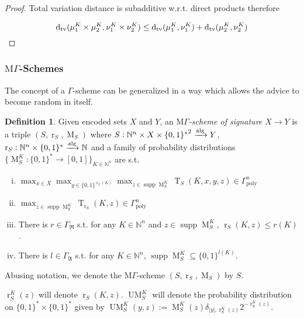 \documentclass{article}
\numberwithin{equation}{section}
\theoremstyle{definition}
\newtheorem{definition}{Definition}[section]
\theoremstyle{plain}
\newcommand{\Bool}{\{0,1\}}
\newcommand{\Words}{{\Bool^*}}
\newcommand{\WordsLen}[1]{{\Bool^{#1}}}
\DeclareMathOperator{\Supp}{supp}
\DeclareMathOperator{\T}{T}
\DeclareMathOperator{\R}{r}
\DeclareMathOperator{\M}{M}
\DeclareMathOperator{\UM}{UM}
\newcommand{\Dtv}{\operatorname{d}_{\textnormal{tv}}}
\newcommand{\Nats}{\mathbb{N}}
\newcommand{\Abs}[1]{\lvert #1 \rvert}
\newcommand{\GrowR}{\Gamma_{\mathfrak{R}}}
\newcommand{\GrowA}{\Gamma_{\mathfrak{A}}}
\newcommand{\MGrow}{\mathrm{M}\Gamma}
\newcommand{\BoolR}[1]{\Bool^{\R_{#1}(K)}}
\newcommand{\Alg}{\xrightarrow{\textnormal{alg}}}
\begin{document}
\begin{proof}

Total variation distance is subadditive w.r.t. direct products therefore 

\[\Dtv(\mu_1^K \times \mu_2^K, \nu_1^K \times \nu_2^K) \leq \Dtv(\mu_1^K, \nu_1^K) + \Dtv(\mu_2^K, \nu_2^K)\]
\end{proof}

\subsubsection{\texorpdfstring{$\MGrow$}{MΓ}-Schemes}

The concept of a $\Gamma$-scheme can be generalized in a way which allows the advice to become random in itself.

\begin{samepage}
\begin{definition}

Given encoded sets $X$ and $Y$, an \emph{$\MGrow$-scheme of signature ${X \rightarrow Y}$} is a triple $(S,\R_S,\M_S)$ where $S: \Nats^n \times X \times \Words^2 \Alg Y$, ${\R_S: \Nats^n \times \Words \Alg \Nats}$ and a family of probability distributions $\{\M_S^K: \Words \rightarrow [0,1]\}_{K \in \Nats^n}$ are s.t.

\begin{enumerate}[(i)]

\item $\max_{x \in X} \max_{y \in \BoolR{S}} \max_{z \in \Supp \M_S^K} \T_S(K,x,y,z) \in \Gamma_{\text{poly}}^n$

\item ${\max_{z \in \Supp \M_S^K} \T_{\R_S}(K,z) \in \Gamma_{\text{poly}}^n}$

\item There is $r \in \GrowR$ s.t. for any $K \in \Nats^n$ and $z \in \Supp \M_S^K$, $\R_S(K,z) \leq r(K)$.

\item There is $l \in \GrowA$ s.t. for any $K \in \Nats^n$, $\Supp \M_S^K \subseteq \WordsLen{l(K)}$.

\end{enumerate}

Abusing notation, we denote the $\MGrow$-scheme $(S,\R_S,\M_S)$ by $S$.

$\R_S^K(z)$ will denote $\R_S(K,z)$. $\UM_S^K$ will denote the probability distribution on ${\Words \times \Words}$ given by $\UM_S^K(y,z):= \M_S^K(z) \delta_{\Abs{y},\R_S^K(z)} 2^{-\R_S^K(z)}$.


\end{definition}
\end{samepage}
\end{document}

